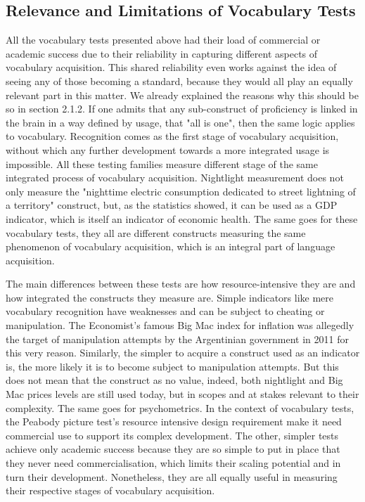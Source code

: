     \subsection{Relevance and Limitations of Vocabulary Tests}
All the vocabulary tests presented above had their load of commercial or academic success due to their reliability in capturing different aspects of vocabulary acquisition. This shared reliability even works against the idea of seeing any of those becoming a standard, because they would all play an equally relevant part in this matter. We already explained the reasons why this should be so in section 2.1.2. If one admits that any sub-construct of proficiency is linked in the brain in a way defined by usage, that "all is one", then the same logic applies to vocabulary. Recognition comes as the first stage of vocabulary acquisition, without which any further development towards a more integrated usage is impossible. All these testing families measure different stage of the same integrated process of vocabulary acquisition. Nightlight measurement does not only measure the "nighttime electric consumption dedicated to street lightning of a territory" construct, but, as the statistics showed, it can be used as a GDP indicator, which is itself an indicator of economic health. The same goes for these vocabulary tests, they all are different constructs measuring the same phenomenon of vocabulary acquisition, which is an integral part of language acquisition.

The main differences between these tests are how resource-intensive they are and how integrated the constructs they measure are. Simple indicators like mere vocabulary recognition have weaknesses and can be subject to cheating or manipulation. The Economist's famous Big Mac index for inflation was allegedly the target of manipulation attempts by the Argentinian government in 2011 \parencite{politi_argentinas_2011} for this very reason. Similarly, the simpler to acquire a construct used as an indicator is, the more likely it is to become subject to manipulation attempts. But this does not mean that the construct as no value, indeed, both nightlight and Big Mac prices levels are still used today, but in scopes and at stakes relevant to their complexity. The same goes for psychometrics. In the context of vocabulary tests, the Peabody picture test's resource intensive design requirement make it need commercial use to support its complex development. The other, simpler tests achieve only academic success because they are so simple to put in place that they never need commercialisation, which limits their scaling potential and in turn their development. Nonetheless, they are all equally useful in measuring their respective stages of vocabulary acquisition.

